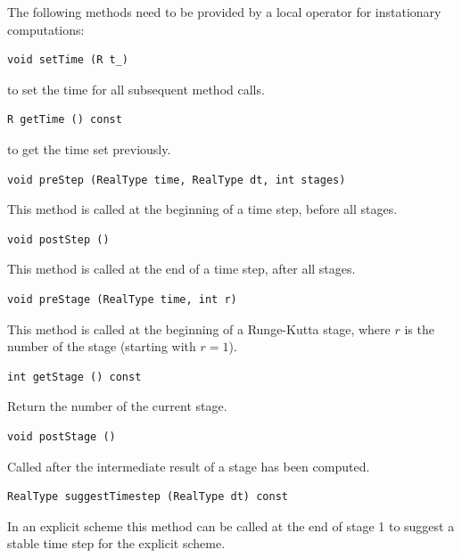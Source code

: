 \documentclass[a4paper,12pt]{article}
\begin{document}
The following methods need to be provided by a local
operator for instationary computations:
\begin{lstlisting}[basicstyle=\ttfamily,
frame=single,
backgroundcolor=\color{listingbg}]
void setTime (R t_)
\end{lstlisting}
to set the time for all subsequent method calls.

\begin{lstlisting}[basicstyle=\ttfamily,
frame=single,
backgroundcolor=\color{listingbg}]
R getTime () const
\end{lstlisting}
to get the time set previously.

\begin{lstlisting}[basicstyle=\ttfamily,
frame=single,
backgroundcolor=\color{listingbg}]
void preStep (RealType time, RealType dt, int stages)
\end{lstlisting}
This method is called at the beginning of a time step, before all stages.

\begin{lstlisting}[basicstyle=\ttfamily,
frame=single,
backgroundcolor=\color{listingbg}]
void postStep ()
\end{lstlisting}
This method is called at the end of a time step, after all stages.

\begin{lstlisting}[basicstyle=\ttfamily,
frame=single,
backgroundcolor=\color{listingbg}]
void preStage (RealType time, int r)
\end{lstlisting}
This method is called at the beginning of a Runge-Kutta stage, where
$r$ is the number of the stage (starting with $r=1$).

\begin{lstlisting}[basicstyle=\ttfamily,
frame=single,
backgroundcolor=\color{listingbg}]
int getStage () const
\end{lstlisting}
Return the number of the current stage.

\begin{lstlisting}[basicstyle=\ttfamily,
frame=single,
backgroundcolor=\color{listingbg}]
void postStage ()
\end{lstlisting}
Called after the intermediate result of a stage has been computed.

\begin{lstlisting}[basicstyle=\ttfamily,
frame=single,
backgroundcolor=\color{listingbg}]
RealType suggestTimestep (RealType dt) const
\end{lstlisting}
In an explicit scheme this method can be called at the end of stage 1
to suggest a stable time step for the explicit scheme.
\end{document}
